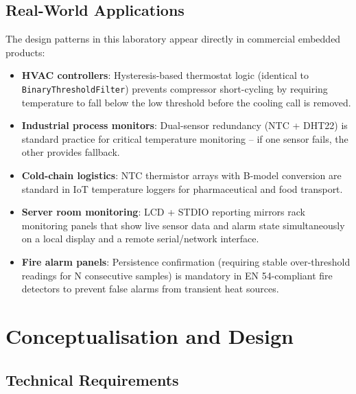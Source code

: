 \documentclass[12pt]{article}
\begin{document}
\subsection{Real-World Applications}
\hspace{0.8cm} The design patterns in this laboratory appear directly in commercial embedded products:

\begin{itemize}
    \item \textbf{HVAC controllers}: Hysteresis-based thermostat logic (identical to \texttt{BinaryThresholdFilter}) prevents compressor short-cycling by requiring temperature to fall below the low threshold before the cooling call is removed.
    \item \textbf{Industrial process monitors}: Dual-sensor redundancy (NTC + DHT22) is standard practice for critical temperature monitoring -- if one sensor fails, the other provides fallback.
    \item \textbf{Cold-chain logistics}: NTC thermistor arrays with B-model conversion are standard in IoT temperature loggers for pharmaceutical and food transport.
    \item \textbf{Server room monitoring}: LCD + STDIO reporting mirrors rack monitoring panels that show live sensor data and alarm state simultaneously on a local display and a remote serial/network interface.
    \item \textbf{Fire alarm panels}: Persistence confirmation (requiring stable over-threshold readings for N consecutive samples) is mandatory in EN 54-compliant fire detectors to prevent false alarms from transient heat sources.
\end{itemize}

\section{Conceptualisation and Design}

\subsection{Technical Requirements}
\end{document}
